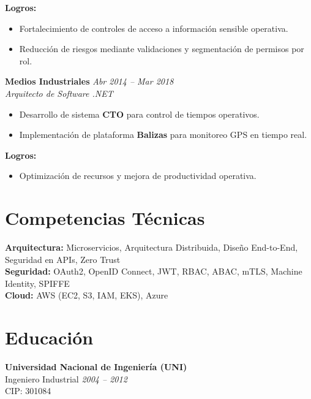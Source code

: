 \documentclass[11pt,a4paper]{article}
\begin{document}
\textbf{Logros:}
\begin{itemize}[leftmargin=*]
  \item Fortalecimiento de controles de acceso a información sensible operativa.
  \item Reducción de riesgos mediante validaciones y segmentación de permisos por rol.
\end{itemize}


\vspace{6pt}

\textbf{Medios Industriales} \hfill \textit{Abr 2014 – Mar 2018}\\
\textit{Arquitecto de Software .NET}

\begin{itemize}[leftmargin=*]
  \item Desarrollo de sistema \textbf{CTO} para control de tiempos operativos.
  \item Implementación de plataforma \textbf{Balizas} para monitoreo GPS en tiempo real.
\end{itemize}

\textbf{Logros:}
\begin{itemize}[leftmargin=*]
  \item Optimización de recursos y mejora de productividad operativa.
\end{itemize}

\section*{Competencias Técnicas}

\textbf{Arquitectura:} Microservicios, Arquitectura Distribuida, Diseño End-to-End, Seguridad en APIs, Zero Trust\\
\textbf{Seguridad:} OAuth2, OpenID Connect, JWT, RBAC, ABAC, mTLS, Machine Identity, SPIFFE\\
\textbf{Cloud:} AWS (EC2, S3, IAM, EKS), Azure\\


\section*{Educación}

\textbf{Universidad Nacional de Ingeniería (UNI)}\\
Ingeniero Industrial \hfill \textit{2004 – 2012}\\
CIP: 301084
\end{document}

